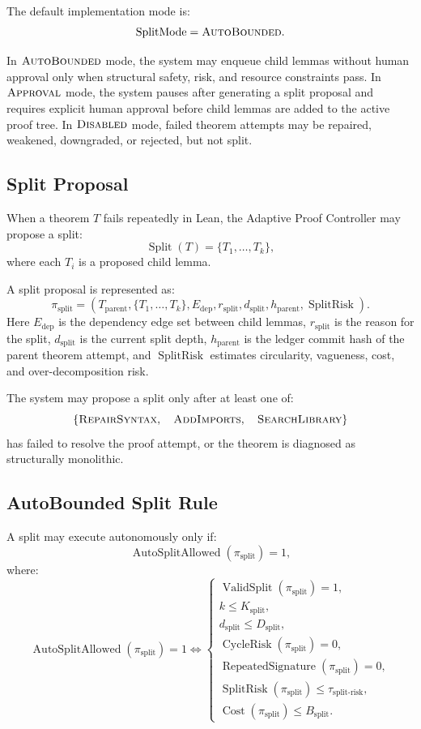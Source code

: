 \documentclass[11pt]{article}
\begin{document}
The default implementation mode is:
$$
\operatorname{SplitMode}=\textsc{AutoBounded}.
$$

In $\textsc{AutoBounded}$ mode, the system may enqueue child lemmas without human approval only when structural safety, risk, and resource constraints pass. In $\textsc{Approval}$ mode, the system pauses after generating a split proposal and requires explicit human approval before child lemmas are added to the active proof tree. In $\textsc{Disabled}$ mode, failed theorem attempts may be repaired, weakened, downgraded, or rejected, but not split.

\subsection{Split Proposal}
When a theorem $T$ fails repeatedly in Lean, the Adaptive Proof Controller may propose a split:
$$
\operatorname{Split}(T)=\{T_1,\dots,T_k\},
$$
where each $T_i$ is a proposed child lemma.

A split proposal is represented as:
$$
\pi_{\text{split}}=(T_{\text{parent}},\{T_1,\dots,T_k\},E_{\text{dep}},r_{\text{split}},d_{\text{split}},h_{\text{parent}},\operatorname{SplitRisk}).
$$
Here $E_{\text{dep}}$ is the dependency edge set between child lemmas, $r_{\text{split}}$ is the reason for the split, $d_{\text{split}}$ is the current split depth, $h_{\text{parent}}$ is the ledger commit hash of the parent theorem attempt, and $\operatorname{SplitRisk}$ estimates circularity, vagueness, cost, and over-decomposition risk.

The system may propose a split only after at least one of:
$$
\{\textsc{RepairSyntax},\quad \textsc{AddImports},\quad \textsc{SearchLibrary}\}
$$
has failed to resolve the proof attempt, or the theorem is diagnosed as structurally monolithic.

\subsection{AutoBounded Split Rule}
A split may execute autonomously only if:
$$
\operatorname{AutoSplitAllowed}(\pi_{\text{split}})=1,
$$
where:
$$
\operatorname{AutoSplitAllowed}(\pi_{\text{split}})=1
\Longleftrightarrow
\begin{cases}
\operatorname{ValidSplit}(\pi_{\text{split}})=1,\\
k\leq K_{\text{split}},\\
d_{\text{split}}\leq D_{\text{split}},\\
\operatorname{CycleRisk}(\pi_{\text{split}})=0,\\
\operatorname{RepeatedSignature}(\pi_{\text{split}})=0,\\
\operatorname{SplitRisk}(\pi_{\text{split}})\leq \tau_{\text{split-risk}},\\
\operatorname{Cost}(\pi_{\text{split}})\leq B_{\text{split}}.
\end{cases}
$$
\end{document}
